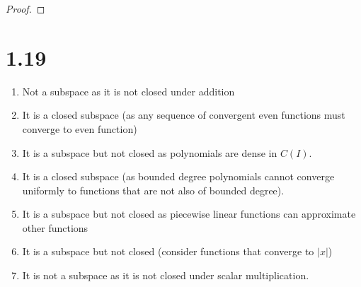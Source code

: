\documentclass[10pt]{article}
\begin{document}
\begin{proof}


\end{proof}

\section*{1.19}

\begin{enumerate}[i]
    \item Not a subspace as it is not closed under addition
    \item It is a closed subspace (as any sequence of convergent even functions must converge to even function)
    \item It is a subspace but not closed as polynomials are dense in $C(I)$.
    \item It is a closed subspace (as bounded degree polynomials cannot converge uniformly to functions that are not also of bounded degree).
    \item It is a subspace but not closed as piecewise linear functions can approximate other functions
    \item It is a subspace but not closed (consider functions that converge to $|x|$)
    \item It is not a subspace as it is not closed under scalar multiplication.
\end{enumerate}
\end{document}
